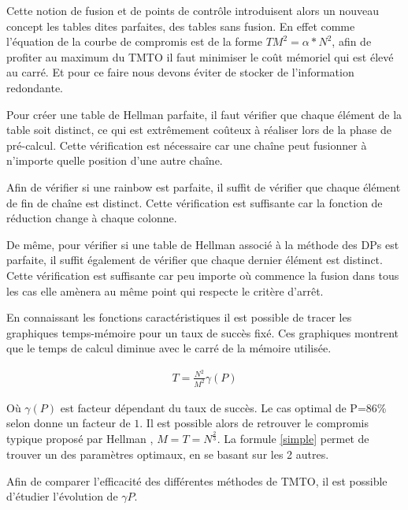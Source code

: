 	Cette notion de fusion et de points de contrôle introduisent alors un nouveau concept les tables dites parfaites, des tables sans fusion. En effet comme l'équation de la courbe de compromis est de la forme $TM^2=\alpha *N^2$, afin de profiter au maximum du \gls{TMTO} il faut minimiser le coût mémoriel qui est élevé au carré. Et pour ce faire nous devons éviter de stocker de l'information redondante.

	\bigskip

	Pour créer une table de Hellman parfaite, il faut vérifier que chaque élément de la table soit distinct, ce qui est extrêmement coûteux à réaliser lors de la phase de pré-calcul. Cette vérification est nécessaire car une chaîne peut fusionner à n'importe quelle position d'une autre chaîne.

	\bigskip

	Afin de vérifier si une \gls{rainbow} est parfaite, il suffit de vérifier que chaque élément de fin de chaîne est distinct. Cette vérification est suffisante car la fonction de réduction change à chaque colonne.

	\bigskip

	De même, pour vérifier si une table de Hellman associé à la méthode des \glspl{DP} est parfaite, il suffit également de vérifier que chaque dernier élément est distinct. Cette vérification est suffisante car peu importe où commence la fusion dans tous les cas elle amènera au même point qui respecte le critère d'arrêt.


	En connaissant les fonctions caractéristiques il est possible de tracer les graphiques temps-mémoire pour un taux de succès fixé. Ces graphiques montrent que le temps de calcul diminue avec le carré de la mémoire utilisée.

	\begin{align}
		T=\frac{N^2}{M^2}\gamma(P) \label{simple} 
	\end{align}

	Où $\gamma(P)$ est facteur dépendant du taux de succès. Le cas optimal de P=86\% selon \cite{checkpoints} donne un facteur de $1$. Il est possible alors de retrouver le compromis typique proposé par Hellman \cite{ehellman}, $M=T=N^{\frac{2}{3}}$. La formule \ref{simple} permet de trouver un des paramètres optimaux, en se basant sur les 2 autres.

	\bigskip

	Afin de comparer l'efficacité des différentes méthodes de \gls{TMTO}, il est possible d'étudier l'évolution de $\gamma{P}$.

